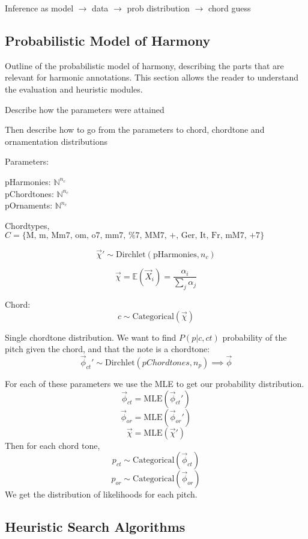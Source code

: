 \documentclass[12pt,a4paper,twoside,openright]{report}
\begin{document}
\par 
Inference as model $\to$ data $\to$ prob distribution $\to$ chord guess

\subsection{Probabilistic Model of Harmony}

Outline of the probabilistic model of harmony, describing the parts that are relevant for harmonic annotations. This section allows the reader to understand the evaluation and heuristic modules.

\par
Describe how the parameters were attained
\par
Then describe how to go from the parameters to chord, chordtone and ornamentation distributions
\par

Parameters:
\par
pHarmonies: $\mathbb{N}^{n_c}$\\
pChordtones: $\mathbb{N}^{n_c}$\\
pOrnaments: $\mathbb{N}^{n_c}$
\par
Chordtypes, $C = \{\text{M,~m, Mm7, om, o7, mm7, \%7, MM7, +, Ger, It, Fr, mM7, +7}\}$

\[\vec{\chi}' \sim \text{Dirchlet} (\text{pHarmonies}, n_c) \]

\[\vec{\chi} = \mathbb{E} (\vec{X}_i) = \frac{\alpha_i}{\sum\limits_j \alpha_j} \]

Chord: \[c \sim \text{Categorical}(\vec{\chi})\]

Single chordtone distribution. We want to find $P(p|c, ct)$ probability of the pitch given the chord, and that the note is a chordtone:
\[\vec{\phi}_{ct}' \sim \text{Dirchlet}(pChordtones, n_p) \implies \vec{\phi}\]

For each of these parameters we use the MLE to get our probability distribution. 
\[\vec{\phi}_{ct} = \text{MLE} (\vec{\phi}_{ct}')\]
\[\vec{\phi}_{or} = \text{MLE} (\vec{\phi}_{or}')\]
\[\vec{\chi}= \text{MLE} (\vec{\chi}') \]
Then for each chord tone,
\[p_{ct} \sim \text{Categorical}(\vec{\phi}_{ct})\]
\[p_{or} \sim \text{Categorical}(\vec{\phi}_{or})\]
We get the distribution of likelihoods for each pitch.






\subsection{Heuristic Search Algorithms}
\end{document}
